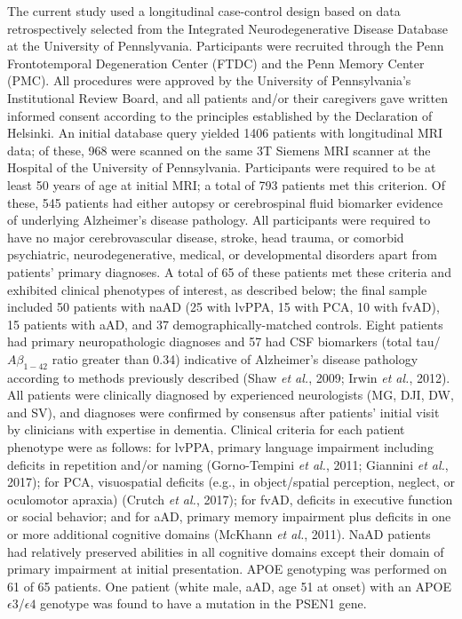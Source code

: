 \documentclass[]{article}
\begin{document}
The current study used a longitudinal case-control design based on data
retrospectively selected from the Integrated Neurodegenerative Disease
Database at the University of Pennslyvania. Participants were recruited
through the Penn Frontotemporal Degeneration Center (FTDC) and the Penn
Memory Center (PMC). All procedures were approved by the University of
Pennsylvania's Institutional Review Board, and all patients and/or their
caregivers gave written informed consent according to the principles
established by the Declaration of Helsinki. An initial database query
yielded 1406 patients with longitudinal MRI data; of these, 968 were
scanned on the same 3T Siemens MRI scanner at the Hospital of the
University of Pennsylvania. Participants were required to be at least 50
years of age at initial MRI; a total of 793 patients met this criterion.
Of these, 545 patients had either autopsy or cerebrospinal fluid
biomarker evidence of underlying Alzheimer's disease pathology. All
participants were required to have no major cerebrovascular disease,
stroke, head trauma, or comorbid psychiatric, neurodegenerative,
medical, or developmental disorders apart from patients' primary
diagnoses. A total of 65 of these patients met these criteria and
exhibited clinical phenotypes of interest, as described below; the final
sample included 50 patients with naAD (25 with lvPPA, 15 with PCA, 10
with fvAD), 15 patients with aAD, and 37 demographically-matched
controls. Eight patients had primary neuropathologic diagnoses and 57
had CSF biomarkers (total tau/\(A\beta_{1-42}\) ratio greater than 0.34)
indicative of Alzheimer's disease pathology according to methods
previously described (Shaw \emph{et al.}, 2009; Irwin \emph{et al.},
2012). All patients were clinically diagnosed by experienced
neurologists (MG, DJI, DW, and SV), and diagnoses were confirmed by
consensus after patients' initial visit by clinicians with expertise in
dementia. Clinical criteria for each patient phenotype were as follows:
for lvPPA, primary language impairment including deficits in repetition
and/or naming (Gorno-Tempini \emph{et al.}, 2011; Giannini \emph{et
al.}, 2017); for PCA, visuospatial deficits (e.g., in object/spatial
perception, neglect, or oculomotor apraxia) (Crutch \emph{et al.},
2017); for fvAD, deficits in executive function or social behavior; and
for aAD, primary memory impairment plus deficits in one or more
additional cognitive domains (McKhann \emph{et al.}, 2011). NaAD
patients had relatively preserved abilities in all cognitive domains
except their domain of primary impairment at initial presentation. APOE
genotyping was performed on 61 of 65 patients. One patient (white male,
aAD, age 51 at onset) with an APOE \(\epsilon3\)/\(\epsilon4\) genotype
was found to have a mutation in the PSEN1 gene.
\end{document}
